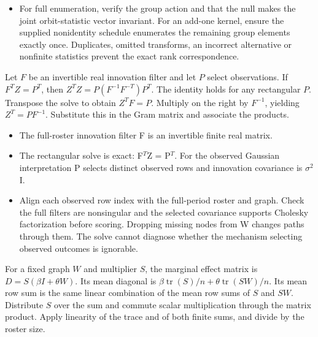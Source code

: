 \expandafter\def\csname statadic@diagnostics@STATADIC-RANDOMIZATION-003\endcsname{\begin{itemize}
\item For full enumeration, verify the group action and that the null makes the joint orbit-statistic vector invariant. For an add-one kernel, ensure the supplied nonidentity schedule enumerates the remaining group elements exactly once. Duplicates, omitted transforms, an incorrect alternative or nonfinite statistics prevent the exact rank correspondence.
\end{itemize}}
\expandafter\def\csname statadic@statement@STATADIC-SPATIAL-002\endcsname{Let $F$ be an invertible real innovation filter and let $P$
  select observations. If $F^T Z=P^T$, then
  $Z^T Z=P(F^{-1}F^{-T})P^T$. The identity holds for any rectangular $P$.}
\expandafter\def\csname statadic@proof@STATADIC-SPATIAL-002\endcsname{Transpose the solve to obtain $Z^T F=P$. Multiply on the right
  by $F^{-1}$, yielding $Z^T=PF^{-1}$. Substitute this in the Gram matrix
  and associate the products.}
\expandafter\def\csname statadic@assumptions@STATADIC-SPATIAL-002\endcsname{\begin{itemize}
\item The full-roster innovation filter F is an invertible finite real matrix.
\item The rectangular solve is exact: F\ensuremath{{}^T}Z = P\ensuremath{{}^T}. For the observed Gaussian interpretation P selects distinct observed rows and innovation covariance is \ensuremath{\sigma}\ensuremath{{}^2}I.
\end{itemize}}
\expandafter\def\csname statadic@diagnostics@STATADIC-SPATIAL-002\endcsname{\begin{itemize}
\item Align each observed row index with the full-period roster and graph. Check the full filters are nonsingular and the selected covariance supports Cholesky factorization before scoring. Dropping missing nodes from W changes paths through them. The solve cannot diagnose whether the mechanism selecting observed outcomes is ignorable.
\end{itemize}}
\expandafter\def\csname statadic@statement@STATADIC-SPATIAL-003\endcsname{For a fixed graph $W$ and multiplier $S$, the marginal effect
  matrix is $D=S(\beta I+\theta W)$. Its mean diagonal is
  $\beta\operatorname{tr}(S)/n+\theta\operatorname{tr}(SW)/n$. Its mean row
  sum is the same linear combination of the mean row sums of $S$ and $SW$.}
\expandafter\def\csname statadic@proof@STATADIC-SPATIAL-003\endcsname{Distribute $S$ over the sum and commute scalar multiplication
  through the matrix product. Apply linearity of the trace and of both finite
  sums, and divide by the roster size.}

